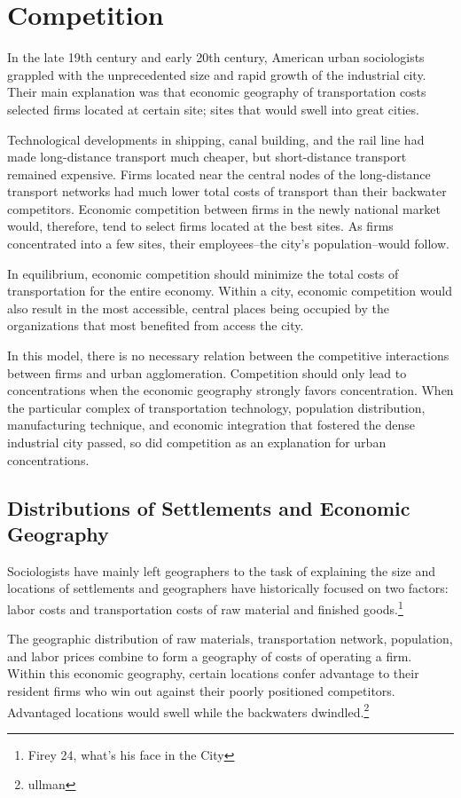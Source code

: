 \section*{Competition} 
In the late 19th century and early 20th century, American urban
sociologists grappled with the unprecedented size and rapid growth of
the industrial city. Their main explanation was that economic
geography of transportation costs selected firms located at certain site;
sites that would swell into great cities.

Technological developments in shipping, canal building, and the rail
line had made long-distance transport much cheaper, but short-distance
transport remained expensive. Firms located near the central nodes of
the long-distance transport networks had much lower total costs of
transport than their backwater competitors. Economic competition
between firms in the newly national market would, therefore, tend to
select firms located at the best sites. As firms concentrated into a
few sites, their employees--the city's population--would follow.

In equilibrium, economic competition should minimize the total costs
of transportation for the entire economy.  Within a city, economic
competition would also result in the most accessible, central places
being occupied by the organizations that most benefited from
access the city.

In this model, there is no necessary relation between the competitive
interactions between firms and urban agglomeration. Competition
should only lead to concentrations when the economic geography
strongly favors concentration. When the particular complex of
transportation technology, population distribution, manufacturing
technique, and economic integration that fostered the dense industrial
city passed, so did competition as an explanation for urban
concentrations.

\subsection*{Distributions of Settlements and Economic Geography}
Sociologists have mainly left geographers to the task of explaining
the size and locations of settlements and geographers have
historically focused on two factors: labor costs and transportation
costs of raw material and finished goods.\footnote{Firey 24, what's
  his face in the City}

The geographic distribution of raw materials, transportation network,
population, and labor prices combine to form a geography of costs of
operating a firm. Within this economic geography, certain locations
confer advantage to their resident firms who win out against their
poorly positioned competitors. Advantaged locations would swell while
the backwaters dwindled.\footnote{ullman}

